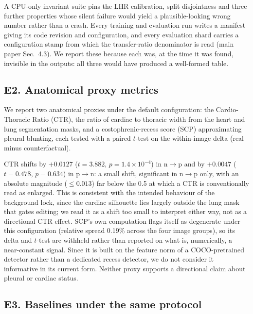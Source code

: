 A CPU-only invariant suite pins the LHR calibration, split disjointness and three further properties whose silent failure would yield a plausible-looking wrong number rather than a crash. Every training and evaluation run writes a manifest giving its code revision and configuration, and every evaluation shard carries a configuration stamp from which the transfer-ratio denominator is read (main paper Sec.~4.3). We report these because each was, at the time it was found, invisible in the outputs: all three would have produced a well-formed table.

\subsection*{E2. Anatomical proxy metrics}
\label{sec:suppl-clinical}

We report two anatomical proxies under the default configuration: the Cardio-Thoracic Ratio (CTR), the ratio of cardiac to thoracic width from the heart and lung segmentation masks, and a costophrenic-recess score (SCP) approximating pleural blunting, each tested with a paired $t$-test on the within-image delta (real minus counterfactual).

CTR shifts by $+0.0127$ ($t=3.882$, $p=1.4\times10^{-4}$) in n$\to$p and by $+0.0047$ ($t=0.478$, $p=0.634$) in p$\to$n: a small shift, significant in n$\to$p only, with an absolute magnitude ($\leq 0.013$) far below the 0.5 at which a CTR is conventionally read as enlarged. This is consistent with the intended behaviour of the background lock, since the cardiac silhouette lies largely outside the lung mask that gates editing; we read it as a shift too small to interpret either way, not as a directional CTR effect.
SCP's own computation flags itself as degenerate under this configuration (relative spread 0.19\% across the four image groups), so its delta and $t$-test are withheld rather than reported on what is, numerically, a near-constant signal. Since it is built on the feature norm of a COCO-pretrained detector rather than a dedicated recess detector, we do not consider it informative in its current form. Neither proxy supports a directional claim about pleural or cardiac status.

\subsection*{E3. Baselines under the same protocol}
\label{sec:suppl-comparison}

